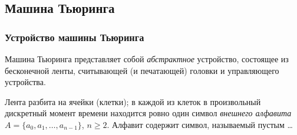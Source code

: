 \subsection{Машина Тьюринга}
\subsubsection{Устройство машины Тьюринга}
Машина Тьюринга представляет собой \textit{абстрактное} устройство, состоящее из бесконечной ленты, считывающей (и печатающей) головки и управляющего устройства.

Лента разбита на ячейки (клетки); в каждой из клеток в произвольный дискретный момент времени находится ровно один символ \textit{внешнего алфавита} $A = \{a_0, a_1, \dots, a_{n - 1}\}$, $n \geqslant 2$. Алфавит содержит символ, называемый пустым \dots